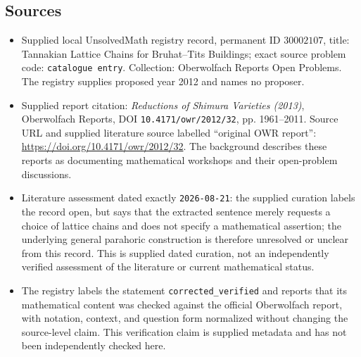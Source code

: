 \documentclass[11pt]{article}
\begin{document}
\subsection{Sources}
\begin{itemize}
\item Supplied local UnsolvedMath registry record, permanent ID \(30002107\), title: Tannakian Lattice Chains for Bruhat--Tits Buildings; exact source problem code: \texttt{catalogue entry}. Collection: Oberwolfach Reports Open Problems. The registry supplies proposed year 2012 and names no proposer.
\item Supplied report citation: \emph{Reductions of Shimura Varieties (2013)}, Oberwolfach Reports, DOI \texttt{10.4171/owr/2012/32}, pp. 1961--2011. Source URL and supplied literature source labelled ``original OWR report'': \url{https://doi.org/10.4171/owr/2012/32}. The background describes these reports as documenting mathematical workshops and their open-problem discussions.
\item Literature assessment dated exactly \texttt{2026-08-21}: the supplied curation labels the record open, but says that the extracted sentence merely requests a choice of lattice chains and does not specify a mathematical assertion; the underlying general parahoric construction is therefore unresolved or unclear from this record. This is supplied dated curation, not an independently verified assessment of the literature or current mathematical status.
\item The registry labels the statement \texttt{corrected\_verified} and reports that its mathematical content was checked against the official Oberwolfach report, with notation, context, and question form normalized without changing the source-level claim. This verification claim is supplied metadata and has not been independently checked here.
\end{itemize}
\end{document}
